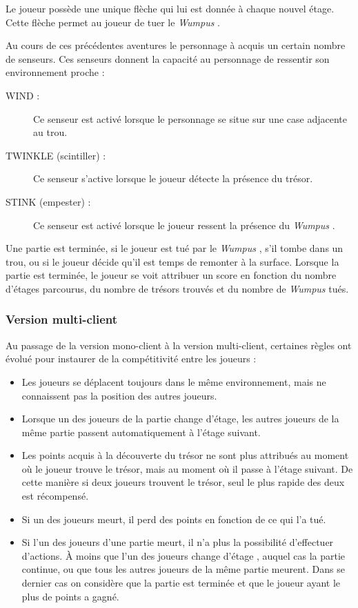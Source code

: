 \documentclass[a4paper,10pt]{article}
\newcommand{\gameName}{\emph{Wumpus }}
\begin{document}
			Le joueur possède une unique flèche qui lui est donnée à chaque nouvel étage. Cette flèche permet au joueur de tuer le \gameName.

			Au cours de ces précédentes aventures le personnage à acquis un certain nombre de senseurs.
			Ces senseurs donnent la capacité au personnage de ressentir son environnement proche :
			\begin{description}
			\item[WIND :] Ce senseur est activé lorsque le personnage se situe sur une case adjacente au trou.
			\item[TWINKLE (scintiller) :] Ce senseur s'active lorsque le joueur détecte la présence du trésor.
			\item[STINK (empester) :] Ce senseur est activé lorsque le joueur ressent la présence du \gameName.
			\end{description}

			Une partie est terminée, si le joueur est tué par le \gameName, s'il tombe dans un trou, ou si le joueur décide qu'il est temps de remonter à la
	surface. Lorsque la partie est terminée, le joueur se voit attribuer un score en fonction du nombre d'étages parcourus, du nombre de trésors trouvés et du
nombre	de \gameName tués.

		\subsubsection{Version multi-client}
			Au passage de la version mono-client à la version multi-client, certaines règles ont évolué pour instaurer de la compétitivité entre les joueurs :
			\begin{itemize}
				\item Les joueurs se déplacent toujours dans le même environnement, mais ne connaissent pas la position des autres joueurs.
				\item Lorsque un des joueurs de la partie change d'étage, les autres joueurs de la même partie passent automatiquement à l'étage
suivant.
				\item Les points acquis à la découverte du trésor ne sont plus attribués au moment où le joueur trouve le trésor, mais au moment où il passe à
l'étage suivant. De cette manière si deux joueurs trouvent le trésor, seul le plus rapide des deux est récompensé.
				\item Si un des joueurs meurt, il perd des points en fonction de ce qui l'a tué.
				\item Si l'un des joueurs d'une partie meurt, il n'a plus la possibilité d'effectuer d'actions. À moins que l'un des joueurs change d'étage
, auquel cas la partie continue, ou que tous les autres joueurs de la même partie meurent. Dans se dernier cas on considère que la partie est terminée et
que le joueur ayant le plus de points a gagné.
			\end{itemize}
\end{document}

